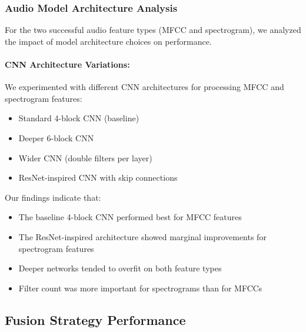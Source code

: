\documentclass[12pt]{article}
\begin{document}
\subsubsection{Audio Model Architecture Analysis}
For the two successful audio feature types (MFCC and spectrogram), we analyzed the impact of model architecture choices on performance.

\paragraph{CNN Architecture Variations:}
We experimented with different CNN architectures for processing MFCC and spectrogram features:
\begin{itemize}
    \item Standard 4-block CNN (baseline)
    \item Deeper 6-block CNN
    \item Wider CNN (double filters per layer)
    \item ResNet-inspired CNN with skip connections
\end{itemize}

Our findings indicate that:
\begin{itemize}
    \item The baseline 4-block CNN performed best for MFCC features
    \item The ResNet-inspired architecture showed marginal improvements for spectrogram features
    \item Deeper networks tended to overfit on both feature types
    \item Filter count was more important for spectrograms than for MFCCs
\end{itemize}

\subsection{Fusion Strategy Performance}
\end{document}
